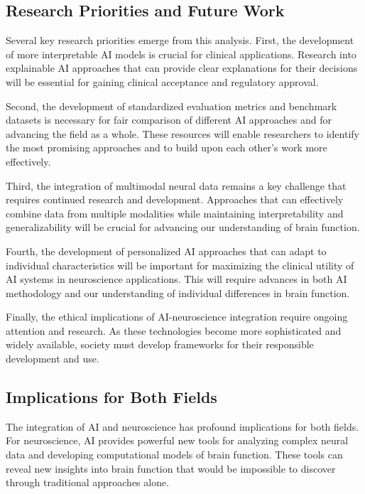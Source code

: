 \documentclass[conference]{IEEEtran}
\begin{document}
\subsection{Research Priorities and Future Work}

Several key research priorities emerge from this analysis. First, the development of more interpretable AI models is crucial for clinical applications. Research into explainable AI approaches that can provide clear explanations for their decisions will be essential for gaining clinical acceptance and regulatory approval.

Second, the development of standardized evaluation metrics and benchmark datasets is necessary for fair comparison of different AI approaches and for advancing the field as a whole. These resources will enable researchers to identify the most promising approaches and to build upon each other's work more effectively.

Third, the integration of multimodal neural data remains a key challenge that requires continued research and development. Approaches that can effectively combine data from multiple modalities while maintaining interpretability and generalizability will be crucial for advancing our understanding of brain function.

Fourth, the development of personalized AI approaches that can adapt to individual characteristics will be important for maximizing the clinical utility of AI systems in neuroscience applications. This will require advances in both AI methodology and our understanding of individual differences in brain function.

Finally, the ethical implications of AI-neuroscience integration require ongoing attention and research. As these technologies become more sophisticated and widely available, society must develop frameworks for their responsible development and use.

\subsection{Implications for Both Fields}

The integration of AI and neuroscience has profound implications for both fields. For neuroscience, AI provides powerful new tools for analyzing complex neural data and developing computational models of brain function. These tools can reveal new insights into brain function that would be impossible to discover through traditional approaches alone.
\end{document}
